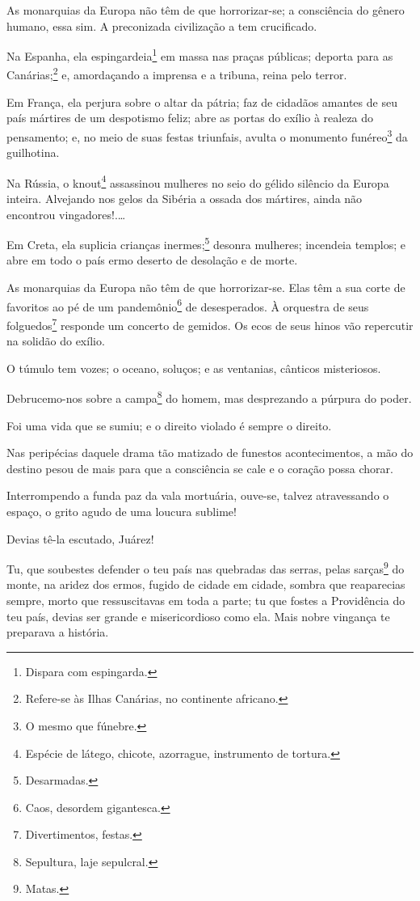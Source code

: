 As monarquias da Europa não têm de que horrorizar-se; a consciência do
gênero humano, essa sim. A preconizada civilização a tem crucificado.

Na Espanha, ela espingardeia\footnote{Dispara com espingarda.} em
massa nas praças públicas; deporta para as Canárias;\footnote{Refere-se
  às Ilhas Canárias, no continente africano.} e, amordaçando a imprensa
e a tribuna, reina pelo terror.

Em França, ela perjura sobre o altar da pátria; faz de cidadãos amantes
de seu país mártires de um despotismo feliz; abre as portas do exílio à
realeza do pensamento; e, no meio de suas festas triunfais, avulta o
monumento funéreo\footnote{O mesmo que fúnebre.} da guilhotina.

Na Rússia, o knout\footnote{Espécie de látego, chicote, azorrague,
  instrumento de tortura.} assassinou mulheres no seio do gélido
silêncio da Europa inteira. Alvejando nos gelos da Sibéria a ossada dos
mártires, ainda não encontrou vingadores!.\ldots{}

Em Creta, ela suplicia crianças inermes;\footnote{Desarmadas.} desonra
mulheres; incendeia templos; e abre em todo o país ermo deserto de
desolação e de morte.

As monarquias da Europa não têm de que horrorizar-se. Elas têm a sua
corte de favoritos ao pé de um pandemônio\footnote{Caos, desordem
  gigantesca.} de desesperados. À orquestra de seus folguedos\footnote{
  Divertimentos, festas.} responde um concerto de gemidos. Os ecos de
seus hinos vão repercutir na solidão do exílio.

O túmulo tem vozes; o oceano, soluços; e as ventanias, cânticos
misteriosos.

Debrucemo-nos sobre a campa\footnote{Sepultura, laje sepulcral.} do
homem, mas desprezando a púrpura do poder.

Foi uma vida que se sumiu; e o direito violado é sempre o direito.

Nas peripécias daquele drama tão matizado de funestos acontecimentos, a
mão do destino pesou de mais para que a consciência se cale e o coração
possa chorar.

Interrompendo a funda paz da vala mortuária, ouve-se, talvez
atravessando o espaço, o grito agudo de uma loucura sublime!

Devias tê-la escutado, Juárez!

Tu, que soubestes defender o teu país nas quebradas das serras, pelas
sarças\footnote{Matas.} do monte, na aridez dos ermos, fugido de
cidade em cidade, sombra que reaparecias sempre, morto que ressuscitavas
em toda a parte; tu que fostes a Providência do teu país, devias ser
grande e misericordioso como ela. Mais nobre vingança te preparava a
história.

